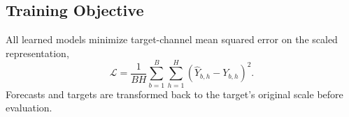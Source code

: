 \subsection{Training Objective}

All learned models minimize target-channel mean squared error on the scaled representation,
\begin{equation}
    \mathcal{L}=\frac{1}{BH}\sum_{b=1}^{B}\sum_{h=1}^{H}
    \left(\hat{Y}_{b,h}-Y_{b,h}\right)^2.
\end{equation}
Forecasts and targets are transformed back to the target's original scale before evaluation.
